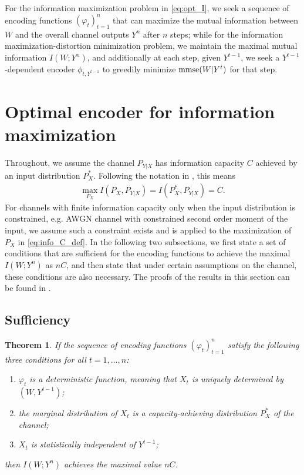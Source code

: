\documentclass{article}
\newtheorem{theorem}{Theorem}%
\begin{document}
For the information maximization problem in \eqref{eq:opt_I}, we seek a sequence of encoding functions $(\varphi_t)_{t=1}^n$ that can maximize the mutual information between $W$ and the overall channel outputs $Y^n$ after $n$ steps; while for the information maximization-distortion minimization problem, we maintain the maximal mutual information $I(W;Y^n)$, and additionally at each step, given $Y^{t-1}$, we seek a $Y^{t-1}$-dependent encoder $\phi_{t, Y^{t-1}}$ to greedily minimize ${\rm mmse}(W|Y^t)$ for that step.


\section{Optimal encoder for information maximization}
Throughout, we assume the channel $P_{Y|X}$ has information capacity $C$ achieved by an input distribution $P_X^*$. Following the notation in \cite{polyanskiy_Wu_book}, this means
\begin{align}
    \max_{P_X } I(P_X, P_{Y|X}) = I(P_X^*, P_{Y|X}) = C . \label{eq:info_C_def}
\end{align}
For channels with finite information capacity only when the input distribution is constrained, e.g. AWGN channel with constrained second order moment of the input, we assume such a constraint exists and is applied to the maximization of $P_X$ in \eqref{eq:info_C_def}.
In the following two subsections, we first state a set of conditions that are sufficient for the encoding functions to achieve the maximal $I(W;Y^n)$ as $nC$, and then state that under certain assumptions on the channel, these conditions are also necessary. The proofs of the results in this section can be found in \cite{info_max_feedback}.
\subsection{Sufficiency}
\begin{theorem}\label{th:suff_info_max}
If the sequence of encoding functions $(\varphi_t)_{t=1}^n$ satisfy the following three conditions for all $t=1,\ldots,n$: 
\begin{enumerate}[leftmargin=*]
    \item 
    $\varphi_t$ is a deterministic function, meaning that $X_t$ is uniquely determined by $(W, Y^{t-1})$;
    \item 
    the marginal distribution of $X_t$ is a capacity-achieving distribution $P_X^*$ of the channel;
    \item 
    $X_t$ is statistically independent of $Y^{t-1}$;
\end{enumerate}
then $I(W;Y^n)$ achieves the maximal value $nC$.
\end{theorem}
\end{document}
